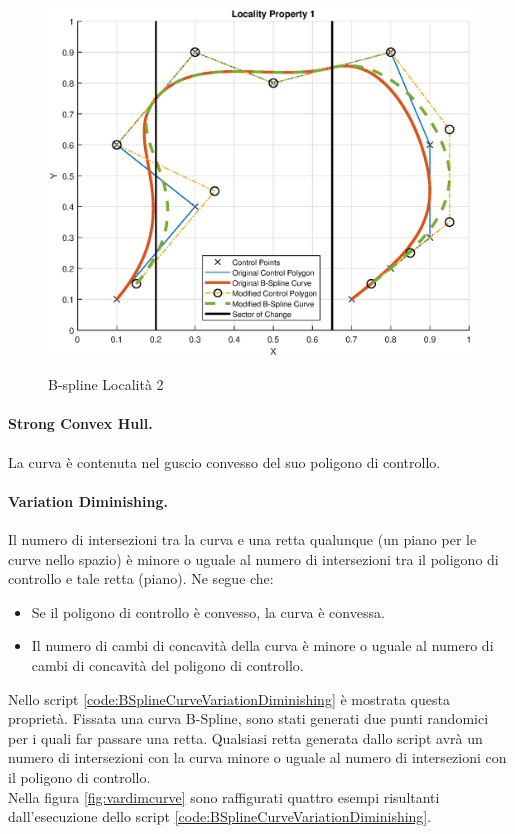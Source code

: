 \documentclass[a4paper, 12pt]{article}
\begin{document}
\begin{figure}[!]
	\centering
	\caption{B-spline Località 2}
	\includegraphics[scale=0.55]{plot_locality_2.eps}
	\label{fig:locality2}
\end{figure}

\paragraph{Strong Convex Hull.}
La curva è contenuta nel guscio convesso del suo poligono di controllo.

\paragraph{Variation Diminishing.}
Il numero di intersezioni tra la curva e una retta qualunque (un piano per le curve
nello spazio) è minore o uguale al numero di intersezioni tra il poligono di controllo e tale retta (piano). Ne segue che:
\begin{itemize}
	\item Se il poligono di controllo è convesso, la curva è convessa.
	\item Il numero di cambi di concavità della curva è minore o uguale al numero di
	      cambi di concavità del poligono di controllo.
\end{itemize}

Nello script \ref{code:BSplineCurveVariationDiminishing} è mostrata questa proprietà. Fissata una curva B-Spline, sono stati generati due punti randomici per i quali far passare una retta. Qualsiasi retta generata dallo script avrà un numero di intersezioni con la curva minore o uguale al numero di intersezioni con il poligono di controllo.\\
Nella figura \ref{fig:vardimcurve} sono raffigurati quattro esempi risultanti dall'esecuzione dello script \ref{code:BSplineCurveVariationDiminishing}.
\end{document}
